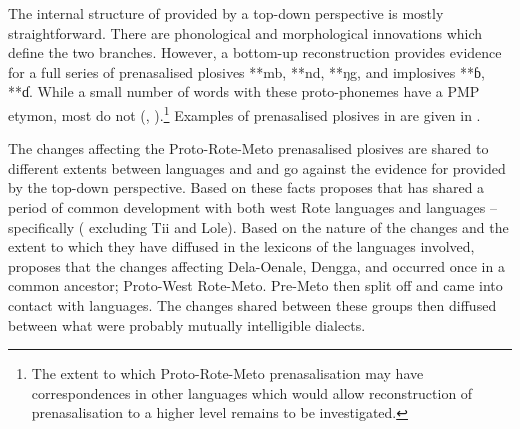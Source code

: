 The internal structure of  provided by a top-down
perspective is mostly straightforward.
There are phonological and morphological innovations which define the two branches.
However, a bottom-up reconstruction provides evidence for a full
series of prenasalised plosives **mb,
**nd, **ŋg, and implosives **ɓ, **ɗ.
While a small number of words with these proto-phonemes have
a PMP etymon, most do not (\citealp[398--402]{Edwards2018a}, \citealp[110--119]{Edwards2023-RMPhon}).\footnote{
		The extent to which
		Proto-Rote-Meto prenasalisation may have correspondences in other
		languages which would allow reconstruction of prenasalisation
		to a higher level remains to be investigated.}
Examples of prenasalised
plosives in  are given in .

The changes affecting the Proto-Rote-Meto prenasalised
plosives are shared to different extents between  languages and  and go against the evidence for 
provided by the top-down perspective.
Based on these facts \citet{Edwards2018c} proposes that 
has shared a period of common development with both west Rote
languages and  languages -- specifically  ( excluding Tii and Lole).
Based on the nature of the changes
and the extent to which they have diffused in the lexicons of
the languages involved, \citet{Edwards2018c} proposes that the changes affecting
Dela-Oenale, Dengga,
and  occurred once in a common ancestor; Proto-West Rote-Meto.
Pre-Meto then split off
and came into contact with  languages.
The changes shared between these groups
then diffused between what were
probably mutually intelligible dialects.

